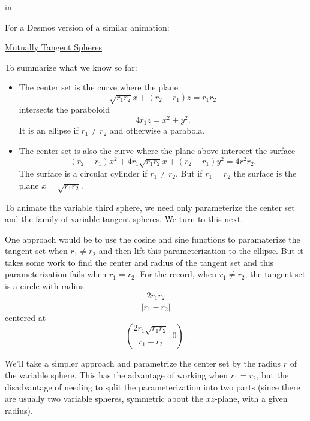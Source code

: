 \documentclass{ximera}
\newcommand{\pskip}{\vskip 0.1 in}
\begin{document}
\pskip
 
For a Desmos version of a similar animation:

\href{https://www.desmos.com/3d/7fb88aea41}{Mutually Tangent Spheres}


To summarize what we know so far:

\begin{itemize}

\item{The center set is the curve where the plane
\[
    \sqrt{r_1 r_2}x + (r_2 - r_1) z = r_1 r_2
\]
intersects the paraboloid
\[
   4r_1z = x^2 + y^2 .
\]
It is an ellipse if $r_1\neq r_2$ and otherwise a parabola.
}

\item{The center set is also the curve where the plane above intersect the surface
\[
       (r_2 - r_1)x^2 + 4 r_1\sqrt{r_1r_2}x + (r_2-r_1)y^2 =  4r_1^2 r_2 .
\]
The surface is a circular cylinder if $r_1\neq r_2$. But if $r_1=r_2$ the surface is the plane $x=\sqrt{r_1r_2}$. 
}

\end{itemize}

To animate the variable third sphere, we need only parameterize the center set and the family of variable tangent spheres. We turn to this next.

One approach would be to use the cosine and sine functions to paramaterize the tangent set when $r_1\neq r_2$ and then lift this parameterization to the ellipse. But it takes some work to find the center and radius of the tangent set and this parameterization fails when $r_1=r_2$. For the record, when $r_1\neq r_2$, the tangent set is a circle with radius
\[
     \frac{2r_1r_2}{|r_1 - r_2|}
\] 
centered at
\[
   \left( \frac{2r_1 \sqrt{r_1r_2}}{r_1-r_2} , 0   \right) .
\]

We'll take a simpler approach and parametrize the center set by the radius $r$ of the variable sphere. This has the advantage of working when $r_1=r_2$, but the disadvantage of needing to split the parameterization into two parts (since there are usually two variable spheres, symmetric about the $xz$-plane, with a given radius).
\end{document}
